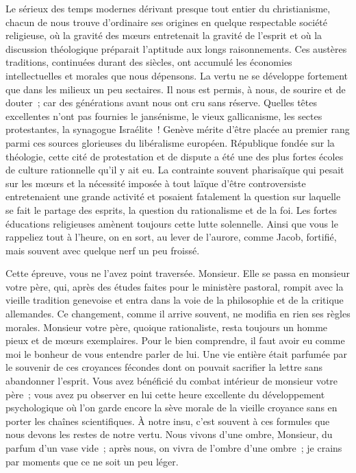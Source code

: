 \documentclass[french,twoside]{book} %
\newcommand\orgName[1]{#1}
\begin{document}
Le sérieux des temps modernes dérivant presque tout entier du christianisme, chacun de nous trouve d’ordinaire ses origines en quelque respectable société religieuse, où la gravité des mœurs entretenait la gravité de l’esprit et où la discussion théologique préparait l’aptitude aux longs raisonnements. Ces austères traditions, continuées durant des siècles, ont accumulé les économies intellectuelles et morales que nous dépensons. La vertu ne se développe fortement que dans les milieux un peu sectaires. Il nous est permis, à nous, de sourire et de douter ; car des générations avant nous ont cru sans réserve. Quelles têtes excellentes n’ont pas fournies le jansénisme, le vieux gallicanisme, les sectes protestantes, la synagogue Israélite ! {\orgName Genève} mérite d’être placée au premier rang parmi ces sources glorieuses du libéralisme européen. République fondée sur la théologie, cette cité de protestation et de dispute a été une des plus fortes écoles de culture rationnelle qu’il y ait eu. La contrainte souvent pharisaïque qui pesait sur les mœurs et la nécessité imposée à tout laïque d’être controversiste entretenaient une grande activité et posaient fatalement la question sur laquelle se fait le partage des esprits, la question du rationalisme et de la foi. Les fortes éducations religieuses amènent toujours cette lutte solennelle. Ainsi que vous le rappeliez tout à l’heure, on en sort, au lever de l’aurore, comme Jacob, fortifié, mais souvent avec quelque nerf un peu froissé.\par
Cette épreuve, vous ne l’avez point traversée. Monsieur. Elle se passa en monsieur votre père, qui, après des études faites pour le ministère pastoral, rompit avec la vieille tradition genevoise et entra dans la voie de la philosophie et de la critique allemandes. Ce changement, comme il arrive souvent, ne modifia en rien ses règles morales. Monsieur votre père, quoique rationaliste, resta toujours un homme pieux et de mœurs exemplaires. Pour le bien comprendre, il faut avoir eu comme moi le bonheur de vous entendre parler de lui. Une vie entière était parfumée par le souvenir de ces croyances fécondes dont on pouvait sacrifier la lettre sans abandonner l’esprit. Vous avez bénéficié du combat intérieur de monsieur votre père ; vous avez pu observer en lui cette heure excellente du développement psychologique où l’on garde encore la sève morale de la vieille croyance sans en porter les chaînes scientifiques. À notre insu, c’est souvent à ces formules que nous devons les restes de notre vertu. Nous vivons d’une ombre, Monsieur, du parfum d’un vase vide ; après nous, on vivra de l’ombre d’une ombre ; je crains par moments que ce ne soit un peu léger.\par
\end{document}
